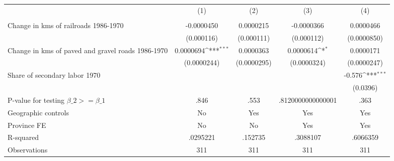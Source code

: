 {
\def\sym#1{\ifmmode^{#1}\else\(^{#1}\)\fi}
\begin{tabular}{l*{4}{c}}
\hline\hline
                &\multicolumn{1}{c}{(1)}&\multicolumn{1}{c}{(2)}&\multicolumn{1}{c}{(3)}&\multicolumn{1}{c}{(4)}\\
                &\multicolumn{1}{c}{}&\multicolumn{1}{c}{}&\multicolumn{1}{c}{}&\multicolumn{1}{c}{}\\
\hline
Change in kms of railroads 1986-1970&-0.0000450         &0.0000215         &-0.0000366         &0.0000466         \\
                &(0.000116)         &(0.000111)         &(0.000112)         &(0.0000850)         \\
[1em]
Change in kms of paved and gravel roads 1986-1970&0.0000694\sym{***}&0.0000363         &0.0000614\sym{*}  &0.0000171         \\
                &(0.0000244)         &(0.0000295)         &(0.0000324)         &(0.0000247)         \\
[1em]
Share of secondary labor 1970&                  &                  &                  &   -0.576\sym{***}\\
                &                  &                  &                  & (0.0396)         \\
\hline
P-value for testing $\beta\_{2} >= \beta\_{1}$&     .846         &     .553         &.8120000000000001         &     .363         \\
Geographic controls&       No         &      Yes         &      Yes         &      Yes         \\
Province FE     &       No         &       No         &      Yes         &      Yes         \\
R-squared       & .0295221         &  .152735         & .3088107         & .6066359         \\
Observations    &      311         &      311         &      311         &      311         \\
\hline\hline
\end{tabular}
}

